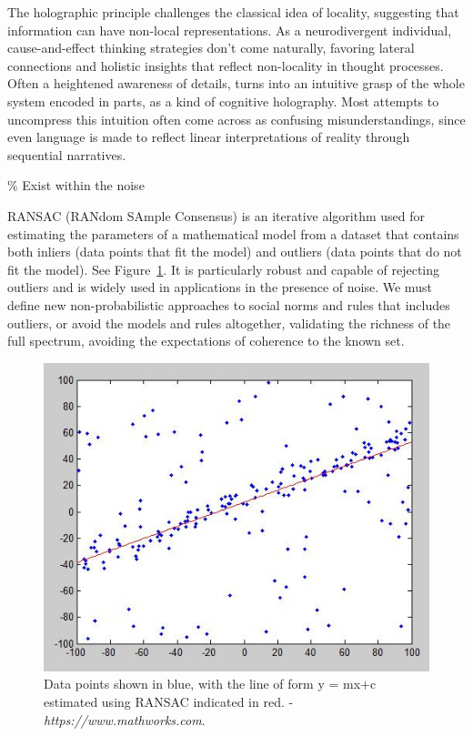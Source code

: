 The holographic principle challenges the classical idea of locality, suggesting that information can have non-local representations. As a neurodivergent individual, cause-and-effect thinking strategies don't come naturally, favoring lateral connections and holistic insights that reflect non-locality in thought processes. Often a heightened awareness of details, turns into an intuitive grasp of the whole system encoded in parts, as a kind of cognitive holography. Most attempts to uncompress this intuition often come across as confusing misunderstandings, since even language is made to reflect linear interpretations of reality through sequential narratives.

{\scriptsize \textcolor{comment}{\% Exist within the noise }}

RANSAC (RANdom SAmple Consensus) is an iterative algorithm used for estimating the parameters of a mathematical model from a dataset that contains both inliers (data points that fit the model) and outliers (data points that do not fit the model). See Figure~\ref{fig:ransac}. It is particularly robust and capable of rejecting outliers and is widely used in applications in the presence of noise. We must define new non-probabilistic approaches to social norms and rules that includes outliers, or avoid the models and rules altogether, validating the richness of the full spectrum, avoiding the expectations of coherence to the known set. 

\begin{figure}
    \centering
    \includegraphics[width=0.8\linewidth]{assets/ransac.jpg} 
    \caption{\small Data points shown in blue, with the line of form y = mx+c estimated using RANSAC indicated in red. - \textit{https://www.mathworks.com}.}
    \label{fig:ransac}
\end{figure}

